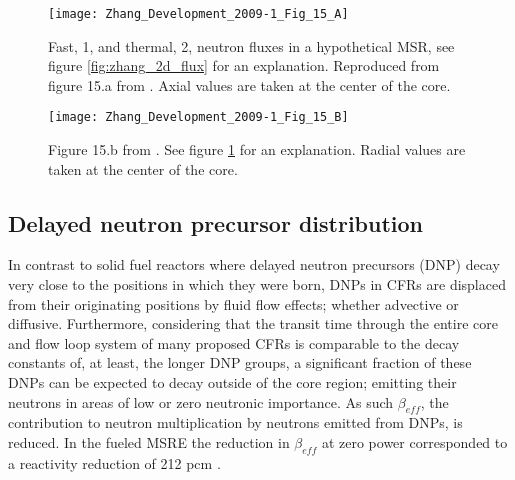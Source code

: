 \documentclass[review]{elsarticle}
\begin{document}
\begin{figure}[h]
   \centering
   \texttt{[image: Zhang\_Development\_2009-1\_Fig\_15\_A]}
   \caption{Fast, 1, and thermal, 2, neutron fluxes in a hypothetical MSR, see figure 
            \ref{fig:zhang_2d_flux} for an explanation. Reproduced from figure 15.a from
            \cite{zhang_development_2009-1}. 
               Axial
               values are taken at the center of the core.}
   \label{fig:zhang_axial_velocity_flux}
\end{figure}

\begin{figure}[h]
   \centering
   \texttt{[image: Zhang\_Development\_2009-1\_Fig\_15\_B]}
   \caption{Figure 15.b from \cite{zhang_development_2009-1}.
            See figure \ref{fig:zhang_axial_velocity_flux} for an explanation.
               Radial 
               values are taken at the center of the core.}
   \label{fig:zhang_radial_velocity_flux}
\end{figure}

\subsection{Delayed neutron precursor distribution} \label{ssec:dnpd}
In contrast to solid fuel reactors where delayed neutron precursors (DNP) decay
 very close to the positions in which they were born, DNPs in CFRs are displaced
 from their originating positions by fluid flow effects; whether advective or
 diffusive. Furthermore, considering that the transit time through the entire
 core and flow loop system of many proposed CFRs is comparable to the decay
 constants of, 
 at least, the longer DNP groups, a significant fraction of these DNPs can be
expected to decay outside of the core region; emitting their neutrons in areas
of low or zero neutronic importance. As such $\beta_{eff}$, 
the contribution to neutron multiplication by neutrons emitted from DNPs,  
is reduced. In the  fueled MSRE the reduction in $\beta_{eff}$ at
zero power corresponded to a reactivity reduction of 212 pcm
 \cite{delpech_benchmark_2003}.
\end{document}
